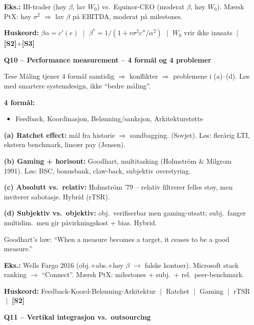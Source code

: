 \documentclass[10pt, a4paper]{article}
\newcommand{\STwo}{\textcolor{s2color}{\textbf{[S2]}}}
\newcommand{\SThree}{\textcolor{s3color}{\textbf{[S3]}}}
\newcommand{\qhead}[2]{%
  \noindent
  \begin{tcolorbox}[colback=boxborder, colframe=boxborder, arc=2pt, left=6pt, right=6pt, top=2pt, bottom=2pt]
    \color{white}\textbf{\large Q#1 -- #2}
  \end{tcolorbox}
}
\newcommand{\huskeord}[1]{%
  \vspace{2pt}
  \begin{tcolorbox}[colback=yellow!15, colframe=orange!70!black, boxrule=0.4pt, arc=2pt, left=4pt, right=4pt, top=2pt, bottom=2pt]
    \footnotesize\textbf{Huskeord:} #1
  \end{tcolorbox}
}
\begin{document}
\textbf{Eks.:} IB-trader (høy $\beta$, lav $W_0$) vs.\ Equinor-CEO (moderat $\beta$, høy $W_0$). Mærsk PtX: høy $\sigma^{2}$ $\Rightarrow$ lav $\beta$ på EBITDA, moderat på milestones.

\huskeord{$\beta\alpha = c'(e)$ $\;\big|\;$ $\beta^{*} = 1/(1+r\sigma^{2}c''/\alpha^{2})$ $\;\big|\;$ $W_0$ vrir ikke innsats $\;\big|\;$ \STwo+\SThree}

\vfill\newpage

\qhead{10}{Performance measurement -- 4 formål og 4 problemer}

\begin{keybox}{Tese}
Måling tjener 4 formål samtidig $\Rightarrow$ konflikter $\Rightarrow$ problemene i (a)--(d). Løs med smartere systemdesign, ikke ``bedre måling''.
\end{keybox}

\textbf{4 formål:}
\begin{itemize}
  \item Feedback, Koordinasjon, Belønning/sanksjon, Arkitekturstøtte
\end{itemize}

\textbf{(a) Ratchet effect:} mål fra historie $\Rightarrow$ sandbagging. (Sovjet). Løs: flerårig LTI, ekstern benchmark, lineær pay (Jensen).

\textbf{(b) Gaming + horisont:} Goodhart, multitasking (Holmström \& Milgrom 1991). Løs: BSC, bonusbank, claw-back, subjektiv overstyring.

\textbf{(c) Absolutt vs.\ relativ:} Holmström '79 -- relativ filtrerer felles støy, men inviterer sabotasje. Hybrid (rTSR).

\textbf{(d) Subjektiv vs.\ objektiv:} obj.\ verifiserbar men gaming-utsatt; subj.\ fanger multidim.\ men gir påvirkningskost + bias. Hybrid.

\begin{formulabox}
Goodhart's law: ``When a measure becomes a target, it ceases to be a good measure.''
\end{formulabox}

\textbf{Eks.:} Wells Fargo 2016 (obj.+abs.+høy $\beta$ $\to$ falske kontoer). Microsoft stack ranking $\to$ ``Connect''. Mærsk PtX: milestones + subj.\ + rel.\ peer-benchmark.

\huskeord{Feedback-Koord-Belønning-Arkitektur $\;\big|\;$ Ratchet $\;\big|\;$ Gaming $\;\big|\;$ rTSR $\;\big|\;$ \STwo}

\vfill\newpage

\qhead{11}{Vertikal integrasjon vs.\ outsourcing}
\end{document}
